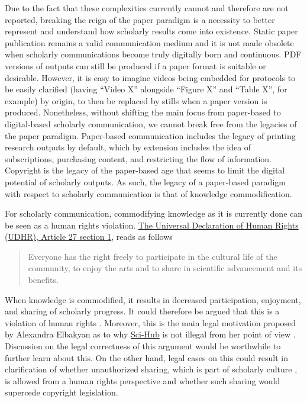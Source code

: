 \documentclass[]{tufte-book}
\begin{document}
Due to the fact that these complexities currently cannot and therefore
are not reported, breaking the reign of the paper paradigm is a
necessity to better represent and understand how scholarly results come
into existence. Static paper publication remains a valid communication
medium and it is not made obsolete when scholarly communications become
truly digitally born and continuous. PDF versions of outputs can still
be produced if a paper format is suitable or desirable. However, it is
easy to imagine videos being embedded for protocols to be easily
clarified (having ``Video X'' alongside ``Figure X'' and ``Table X'',
for example) by origin, to then be replaced by stills when a paper
version is produced. Nonetheless, without shifting the main focus from
paper-based to digital-based scholarly communication, we cannot break
free from the legacies of the paper paradigm. Paper-based communication
includes the legacy of printing research outputs by default, which by
extension includes the idea of subscriptions, purchasing content, and
restricting the flow of information. Copyright is the legacy of the
paper-based age that seems to limit the digital potential of scholarly
outputs. As such, the legacy of a paper-based paradigm with respect to
scholarly communication is that of knowledge commodification.

For scholarly communication, commodifying knowledge as it is currently
done can be seen as a human rights violation.
\href{http://wayback.archive.org/web/20170510094028/http://www.un.org/en/universal-declaration-human-rights/index.html}{The
Universal Declaration of Human Rights (UDHR), Article 27 section 1},
reads as follows

\begin{quote}
Everyone has the right freely to participate in the cultural life of the
community, to enjoy the arts and to share in scientific advancement and
its benefits.
\end{quote}

When knowledge is commodified, it results in decreased participation,
enjoyment, and sharing of scholarly progress. It could therefore be
argued that this is a violation of human rights \citep{udhr}. Moreover,
this is the main legal motivation proposed by Alexandra Elbakyan as to
why \href{http://sci-hub.bz}{Sci-Hub} is not illegal from her point of
view \citep{alexandraelbakyan}. Discussion on the legal correctness of
this argument would be worthwhile to further learn about this. On the
other hand, legal cases on this could result in clarification of whether
unauthorized sharing, which is part of scholarly culture
\citep{10.1038/545145a}, is allowed from a human rights perspective and
whether such sharing would supercede copyright legislation.
\end{document}
